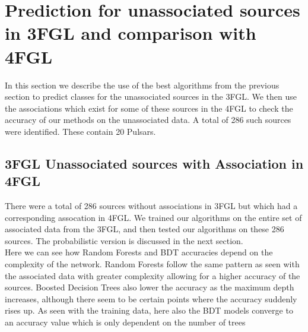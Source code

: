 \section{Prediction for unassociated sources in 3FGL and comparison with 4FGL}


In this section we describe the use of the best algorithms from the previous section to predict classes for the unassociated sources in the 3FGL. We then use the associations which exist for some of these sources in the 4FGL to check the accuracy of our methods on the unassociated data.  A total of 286 such sources were identified. These contain 20 Pulsars. \\


\subsection{3FGL Unassociated sources with Association in 4FGL}
There were a total of 286 sources without associations in 3FGL but which had a corresponding assocation in 4FGL. We trained our algorithms on the entire set of associated data from the 3FGL, and then tested our algorithms on these 286 sources. The probabilistic version is discussed in the next section.  \\

Here we can see how Random Forests and BDT accuracies depend on the complexity of the network. Random Forests follow the same pattern as seen with the associated data with greater complexity allowing for a higher accuracy of the sources. Boosted Decision Trees also lower the accuracy as the maximum depth increases, although there seem to be certain points where the accuracy suddenly rises up. As seen with the training data, here also the BDT models converge to an accuracy value which is only dependent on the number of trees\\

